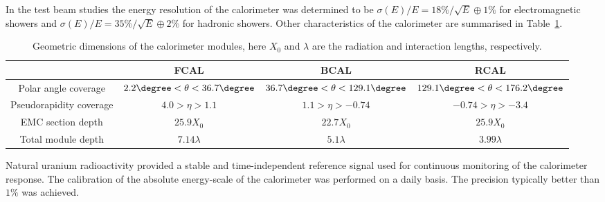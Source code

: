 In the test beam studies the energy resolution of the calorimeter was determined to be $\sigma\left( E \right ) / E = 18\%/\sqrt{E} \oplus 1\%$ for electromagnetic showers and $\sigma\left( E \right ) / E = 35\%/\sqrt{E} \oplus 2\%$ for hadronic showers. Other characteristics of the \zeus calorimeter are summarised in Table~\ref{tab:calparams}.

\begin{table}[htbp]
	\centering
	{\small
		\begin{tabular}{|c|c|c|c|}
			     \hline
      &FCAL & BCAL & RCAL \\
			\hline
			\hline
			Polar angle coverage & $2.2\degree < \theta < 36.7\degree$ & $36.7\degree < \theta < 129.1\degree$ & $129.1\degree < \theta < 176.2\degree$ \\ \hline
			Pseudorapidity coverage & $4.0 > \eta > 1.1$ & $1.1 > \eta > -0.74$ & $-0.74 > \eta > -3.4$ \\ \hline
			EMC section depth & $25.9 X_0$ & $22.7 X_0$ & $25.9 X_0$ \\ \hline
			Total module depth & $7.14 \lambda$ & $5.1 \lambda$ & $3.99 \lambda$ \\ \hline		
		\end{tabular}
	}
	\caption{Geometric dimensions of the calorimeter modules, here $X_0$ and $\lambda$ are the radiation and interaction lengths, respectively.}
	\label{tab:calparams}
\end{table}

Natural uranium radioactivity provided a stable and time-independent reference signal used for continuous monitoring of the calorimeter response. The calibration of the absolute energy-scale of the calorimeter was performed on a daily basis. The precision typically better than $1\%$ was achieved.
